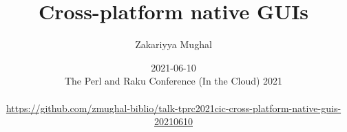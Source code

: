 
\title{Cross-platform native GUIs}
\providecommand{\subtitle}[1]{}
\subtitle{\{trade,pay\}offs, \{integra,distribu\}tion}
\author{Zakariyya Mughal}
\date[2021-06-10]{2021-06-10 \\[2ex]
{The Perl and Raku Conference (In the Cloud) 2021} \\[2ex]
\\[1ex]
\btVFill
%
{\tiny\url{https://github.com/zmughal-biblio/talk-tprc2021cic-cross-platform-native-guis-20210610}}
}
